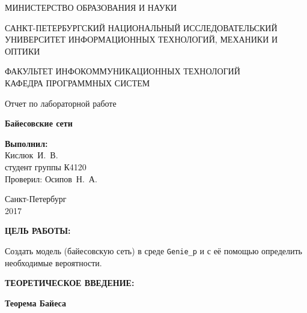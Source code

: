 \documentclass[14pt,a4paper]{extreport}
\newcommand{\header}[1]{%
{
\clearpage%
\fontsize{16pt}{14pt}\selectfont
\begin{center}
\textbf{\MakeUppercase{#1}:}
\end{center}
}
}
\newcommand{\labyear}{2017}
\newcommand{\labtitle}{Байесовские сети}
\newcommand{\prepod}{Осипов~Н.~А.}
\newcommand{\student}{Кислюк~И.~В.}
\begin{document}
	\begin{titlepage}
	\begin{center}	
		\fontsize{14pt}{14pt}\selectfont
		МИНИСТЕРСТВО ОБРАЗОВАНИЯ И НАУКИ\\

		\vspace*{0.6\baselineskip}

		\MakeUppercase{Санкт-Петербургский Национальный Исследовательский Университет Информационных технологий, механики и оптики}		
		
		\vspace*{0.6\baselineskip}
		\MakeUppercase{Факультет Инфокоммуникационных технологий}\\
		\MakeUppercase{Кафедра программных систем}
	
		\vspace*{7\baselineskip}
		\fontsize{19pt}{18pt}\selectfont
		Отчет по лабораторной работе
		
		\fontsize{20pt}{18pt}\selectfont
		\textbf{\labtitle}\\
		\vspace*{1.15\baselineskip}
		\end{center}
	
	\vspace*{2\baselineskip}
	\begin{flushright}
	\fontsize{14pt}{14pt}\selectfont
	\textbf{Выполнил:}\\
	\student\\
	студент группы К4120\\
	Проверил: \prepod\\
	\end{flushright}
	
	\vspace{\fill}
	\begin{center}
	Санкт-Петербург\\
	\vspace{-1ex}
	\labyear
	\end{center}
	
\end{titlepage}

\fontsize{14pt}{14pt}\selectfont

\header{Цель работы}

Создать модель (байесовскую сеть) в среде \texttt{Genie\_{}p} и с её помощью определить необходимые вероятности.

\header{Теоретическое введение}

\begin{center}
\textbf{Теорема Байеса}
\end{center}
\end{document}
